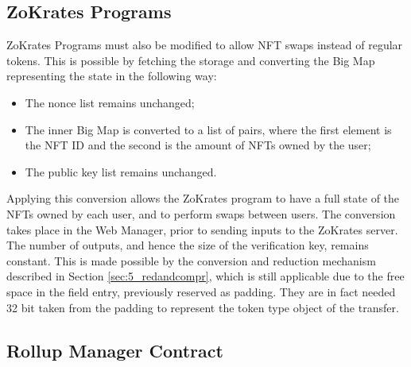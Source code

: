 \subsection{ZoKrates Programs}

ZoKrates Programs must also be modified to allow NFT swaps instead of regular tokens. This is possible by fetching the storage and converting the Big Map representing the state in the following way:
\begin{itemize}
	\item The nonce list remains unchanged;
	\item The inner Big Map is converted to a list of pairs, where the first element is the NFT ID and the second is the amount of NFTs owned by the user;
	\item The public key list remains unchanged.
\end{itemize}

Applying this conversion allows the ZoKrates program to have a full state of the NFTs owned by each user, and to perform swaps between users. The conversion takes place in the Web Manager, prior to sending inputs to the ZoKrates server. The number of outputs, and hence the size of the verification key, remains constant. This is made possible by the conversion and reduction mechanism described in Section \ref{sec:5_redandcompr}, which is still applicable due to the free space in the field entry, previously reserved as padding. They are in fact needed 32 bit taken from the padding to represent the token type object of the transfer.

\subsection{Rollup Manager Contract}


